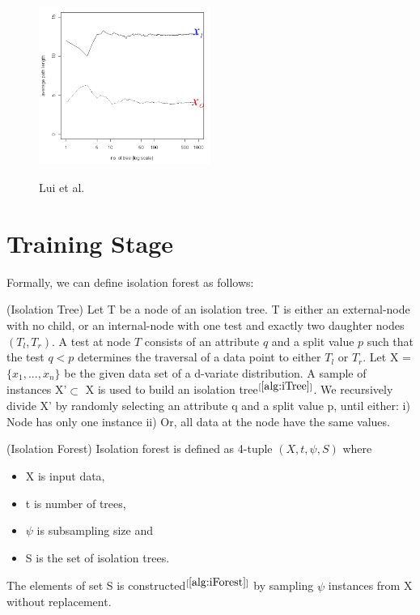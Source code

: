 \vspace{1em}
\begin{figure}[!ht]
    \label{fig:path-length}
    \centering
    \includegraphics[width=0.50\textwidth]{../fig/chapter2/path-length-for-that-point.png}
    
    {Lui et al. \cite{10.1145/2133360.2133363}}
\end{figure}

\section{Training Stage}
\label{sec:iforest-training}

Formally, we can define isolation forest as follows:

\begin{defn}
    \label{defn:isolation-tree}
    (Isolation Tree)
    Let T be a node of an isolation tree.
    T is either an external-node with no child, or an internal-node with one test and exactly two daughter nodes $(T_l, T_r)$.
    A test at node $T$ consists of an attribute $q$ and a split value $p$ such that the test $q < p$ determines the traversal of a data point to either $T_l$ or $T_r$.
    Let X = $\{x_1, ..., x_n\}$ be the given data set of a d-variate distribution.
    A sample of instances X'$\subset$ X is used to build an isolation tree$^{[\ref{alg:iTree}]}$.
    We recursively divide X' by randomly selecting an attribute q and a split value p, until either: i) Node has only one instance ii) Or, all data at the node have the same values.
\end{defn}


\begin{defn}
    \label{defn:isolation-forest}
    (Isolation Forest)
    Isolation forest is defined as 4-tuple $(X, t, \psi, S)$ where
    \vspace{-1em}
    \begin{itemize}
        \setlength\itemsep{-1em}
        \item X is input data,
        \item t is number of trees,
        \item $\psi$ is subsampling size and
        \item S is the set of isolation trees.
    \end{itemize}
    \vspace{-1em}
    The elements of set S is constructed$^{[\ref{alg:iForest}]}$ by sampling $\psi$ instances from X without replacement.
\end{defn}

